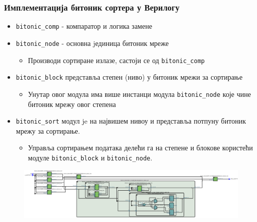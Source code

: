 \begin{frame}[fragile]
\frametitle{Имплементација битоник сортера у Верилогу}
 \begin{itemize}
  \item \verb+bitonic_comp+ - компаратор и логика замене
  \item \verb+bitonic_node+ - основна jединица битоник мреже
  \begin{itemize}
   \item Производи сортиране излазе, састоји се од \verb+bitonic_comp+
  \end{itemize}
  \item \verb+bitonic_block+ представља степен (ниво) у битоник мрежи за сортирање
  \begin{itemize}
   \item Унутар овог модула има више инстанци модула \verb+bitonic_node+ које чине битоник мрежу овог степена
  \end{itemize}
  \item \verb+bitonic_sort+ модул je на највишем нивоу и представља потпуну битоник мрежу за сортирање.
  \begin{itemize}
    \item Управља сортирањем података делећи га на степене и блокове користећи модуле \verb+bitonic_block+ и \verb+bitonic_node+.
  \end{itemize}
 \end{itemize}

 \begin{figure}[H]
  \centering
      \includegraphics[scale=0.15]{slike/rtl_verilog}
 \end{figure}
\end{frame}


